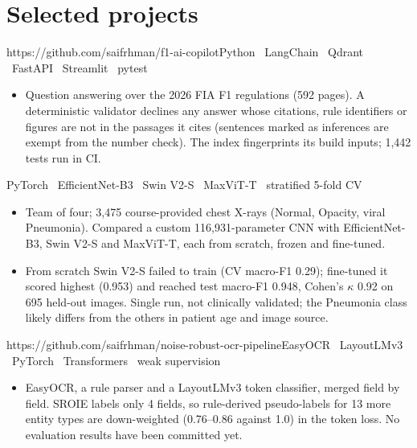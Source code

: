 \documentclass[10pt]{article}
\begin{document}
\section{Selected projects}
  {https://github.com/saifrhman/f1-ai-copilot}{Python \textbullet\ LangChain \textbullet\ Qdrant \textbullet\ FastAPI \textbullet\ Streamlit \textbullet\ pytest}
\begin{itemize}
  \item Question answering over the 2026 FIA F1 regulations (592 pages). A deterministic validator declines any
    answer whose citations, rule identifiers or figures are not in the passages it cites (sentences marked as
    inferences are exempt from the number check). The index fingerprints its build inputs; 1,442 tests run in CI.
\end{itemize}
\gap
{}
  {PyTorch \textbullet\ EfficientNet-B3 \textbullet\ Swin V2-S \textbullet\ MaxViT-T \textbullet\ stratified 5-fold CV}
\begin{itemize}
  \item Team of four; 3,475 course-provided chest X-rays (Normal, Opacity, viral Pneumonia). Compared a custom
    116,931-parameter CNN with EfficientNet-B3, Swin V2-S and MaxViT-T, each from scratch, frozen and fine-tuned.
  \item From scratch Swin V2-S failed to train (CV macro-F1 0.29); fine-tuned it scored highest (0.953) and reached
    test macro-F1 0.948, Cohen's $\kappa$ 0.92 on 695 held-out images. Single run, not clinically validated; the
    Pneumonia class likely differs from the others in patient age and image source.
\end{itemize}
\gap
{}
  {https://github.com/saifrhman/noise-robust-ocr-pipeline}{EasyOCR \textbullet\ LayoutLMv3 \textbullet\ PyTorch \textbullet\ Transformers \textbullet\ weak supervision}
\begin{itemize}
  \item EasyOCR, a rule parser and a LayoutLMv3 token classifier, merged field by field. SROIE labels only 4 fields,
    so rule-derived pseudo-labels for 13 more entity types are down-weighted (0.76--0.86 against 1.0) in the token
    loss. No evaluation results have been committed yet.
\end{itemize}
\end{document}
